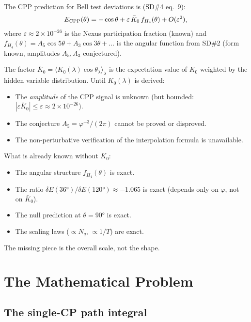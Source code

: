 \documentclass[11pt,a4paper]{article}
\newcommand{\phig}{\varphi}
\newcommand{\eps}{\varepsilon}
\begin{document}
The CPP prediction for Bell test deviations is (SD\#4 eq.~9):
\begin{equation}
E_{\rm CPP}(\theta) = -\cos\theta
+ \eps\,\bar{K}_0\,f_{H_4}(\theta) + O(\eps^2),
\label{eq:E_CPP}
\end{equation}
where $\eps \approx 2\times10^{-26}$ is the Nexus participation
fraction (known) and $f_{H_4}(\theta) = A_5\cos5\theta +
A_3\cos3\theta + \ldots$ is the angular function from SD\#2 (form
known, amplitudes $A_5, A_3$ conjectured).

The factor $\bar{K}_0 = \langle K_0(\lambda)\cos\theta_\lambda
\rangle_\lambda$ is the expectation value of $K_0$ weighted by the
hidden variable distribution.  Until $K_0(\lambda)$ is derived:

\begin{itemize}
\item The \emph{amplitude} of the CPP signal is unknown (but bounded:
  $|\eps\bar K_0| \leq \eps \approx 2\times10^{-26}$).
\item The conjecture $A_5 = \phig^{-3}/(2\pi)$ cannot be proved
  or disproved.
\item The non-perturbative verification of the interpolation formula
  is unavailable.
\end{itemize}

What is already known without $K_0$:
\begin{itemize}
\item The angular structure $f_{H_4}(\theta)$ is exact.
\item The ratio $\delta E(36°)/\delta E(120°) \approx -1.065$
  is exact (depends only on $\phig$, not on $\bar K_0$).
\item The null prediction at $\theta = 90°$ is exact.
\item The scaling laws ($\propto N_q$, $\propto 1/T$) are exact.
\end{itemize}

The missing piece is the overall scale, not the shape.

\section{The Mathematical Problem}

\subsection{The single-CP path integral}
\end{document}
